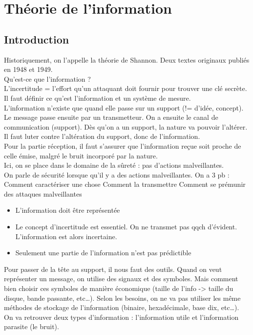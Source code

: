 \section{Théorie de l'information}
\subsection{Introduction}
Historiquement, on l'appelle la théorie de Shannon. Deux textes originaux publiés en 1948 et 1949.\\
Qu'est-ce que l'information ?\\
L'incertitude  = l'effort qu'un attaquant doit fournir pour trouver une clé secrète.\\
Il faut définir ce qu'est l'information et un système de mesure.\\
L'information n'existe que quand elle passe sur un support (!= d'idée, concept). Le message passe ensuite par un transmetteur. On a ensuite le canal de communication (support). Dès qu'on a un support, la nature va pouvoir l'altérer. Il faut luter contre l'altération du support, donc de l'information.\\
Pour la partie réception, il faut s'assurer que l'information reçue soit proche de celle émise, malgré le bruit incorporé par la nature.\\
Ici, on se place dans le domaine de la sûreté : pas d'actions malveillantes.\\
On parle de sécurité lorsque qu'il y a des actions malveillantes.
On a 3 pb :
Comment caractériser une chose
Comment la transmettre
Comment se prémunir des attaques malveillantes

\begin{itemize}
 \item L'information doit être représentée
 \item Le concept d'incertitude est essentiel. On ne transmet pas qqch d'évident. L'information est alors incertaine.
 \item Seulement une partie de l'information n'est pas prédictible
\end{itemize}

Pour passer de la tête au support, il nous faut des outils. Quand on veut représenter un message, on utilise des signaux et des symboles. Mais comment bien choisir ces symboles de manière économique (taille de l'info -> taille du disque, bande passante, etc\ldots). Selon les besoins, on ne va pas utiliser les même méthodes de stockage de l'information (binaire, hexadécimale, base dix, etc\ldots).\\
On va retrouver deux types d'information : l'information utile et l'information parasite (le bruit).

